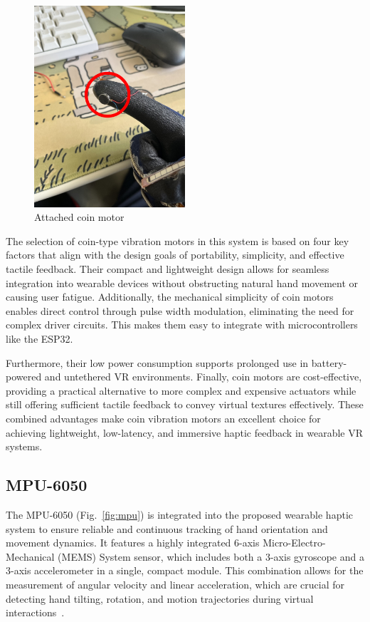 \begin{figure}[H]\centering
	\includegraphics[width=0.5\textwidth]{Pictures/coin_motor_2.png}%
	\caption{Attached coin motor}\label{fig:coin_motor_2}%
\end{figure}

The selection of coin-type vibration motors in this system is based on four key factors that align with the design goals of portability, simplicity, and effective tactile feedback. Their compact and lightweight design allows for seamless integration into wearable devices without obstructing natural hand movement or causing user fatigue. Additionally, the mechanical simplicity of coin motors enables direct control through pulse width modulation, eliminating the need for complex driver circuits. This makes them easy to integrate with microcontrollers like the ESP32. 

Furthermore, their low power consumption supports prolonged use in battery-powered and untethered VR environments. Finally, coin motors are cost-effective, providing a practical alternative to more complex and expensive actuators while still offering sufficient tactile feedback to convey virtual textures effectively. These combined advantages make coin vibration motors an excellent choice for achieving lightweight, low-latency, and immersive haptic feedback in wearable VR systems.
\newpage
\subsection{MPU-6050}
The MPU-6050 (Fig.~\ref{fig:mpu}) is integrated into the proposed wearable haptic system to ensure reliable and continuous tracking of hand orientation and movement dynamics. It features a highly integrated 6-axis Micro-Electro-Mechanical  (MEMS) System sensor, which includes both a 3-axis gyroscope and a 3-axis accelerometer in a single, compact module. This combination allows for the measurement of angular velocity and linear acceleration, which are crucial for detecting hand tilting, rotation, and motion trajectories during virtual interactions~\cite{mpu}.

